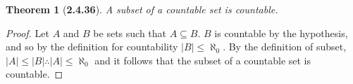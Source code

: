 \documentclass[a4paper, 12pt]{article}
\theoremstyle{plain}
\newtheorem*{theorem*}{Theorem}
\begin{document}
	
\begin{theorem*}[\textbf{2.4.36}]
    A subset of a countable set is countable.
\end{theorem*}

\begin{proof}
    Let $A$ and $B$ be sets such that $A \subseteq B$. $B$ is countable by the hypothesis, and 
    so by the definition for countability $|B| \le \aleph_0$. By the definition of subset, 
    $|A| \le |B| \therefore |A| \le \aleph_0$ and it follows that the subset of a countable set 
    is countable.
\end{proof}
\end{document}
